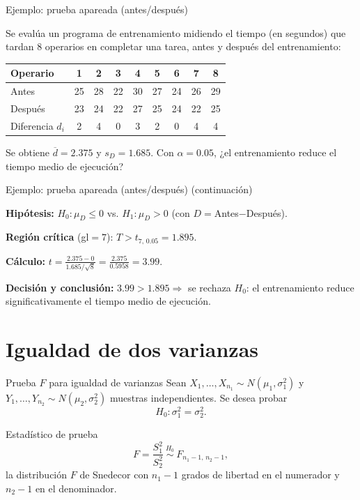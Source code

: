 \documentclass[aspectratio=169,11pt]{beamer}
\begin{document}
\begin{frame}{Ejemplo: prueba apareada (antes/después)}
\begin{example}
Se evalúa un programa de entrenamiento midiendo el tiempo (en segundos) que tardan $8$ operarios en completar una tarea, antes y después del entrenamiento:
\begin{center}
\small
\begin{tabular}{@{}lcccccccc@{}}
\toprule
Operario & 1 & 2 & 3 & 4 & 5 & 6 & 7 & 8 \\
\midrule
Antes & 25 & 28 & 22 & 30 & 27 & 24 & 26 & 29 \\
Después & 23 & 24 & 22 & 27 & 25 & 24 & 22 & 25 \\
Diferencia $d_i$ & 2 & 4 & 0 & 3 & 2 & 0 & 4 & 4 \\
\bottomrule
\end{tabular}
\end{center}
Se obtiene $\overline{d}=2.375$ y $s_D=1.685$. Con $\alpha=0.05$, ¿el entrenamiento reduce el tiempo medio de ejecución?

\end{example}
\end{frame}

\begin{frame}{Ejemplo: prueba apareada (antes/después) (continuación)}
\begin{example}
\textbf{Hipótesis:} $H_0:\mu_D\le0$ vs. $H_1:\mu_D>0$ (con $D=$Antes$-$Después).

\textbf{Región crítica} (gl$=7$): $T>t_{7,\,0.05}=1.895$.

\textbf{Cálculo:} $\displaystyle t=\frac{2.375-0}{1.685/\sqrt{8}}=\frac{2.375}{0.5958}=3.99$.

\textbf{Decisión y conclusión:} $3.99>1.895\Rightarrow$ se rechaza $H_0$: el entrenamiento reduce significativamente el tiempo medio de ejecución.
\end{example}
\end{frame}

\section{Igualdad de dos varianzas}

\begin{frame}{Prueba $F$ para igualdad de varianzas}
Sean $X_1,\dots,X_{n_1}\sim N(\mu_1,\sigma_1^2)$ y $Y_1,\dots,Y_{n_2}\sim N(\mu_2,\sigma_2^2)$ muestras independientes. Se desea probar
\[
H_0:\sigma_1^2=\sigma_2^2.
\]

\begin{block}{Estadístico de prueba}
\[
F=\frac{S_1^2}{S_2^2} \ \overset{H_0}{\sim}\ F_{n_1-1,\,n_2-1},
\]
la distribución $F$ de Snedecor con $n_1-1$ grados de libertad en el numerador y $n_2-1$ en el denominador.
\end{block}

\end{frame}
\end{document}

